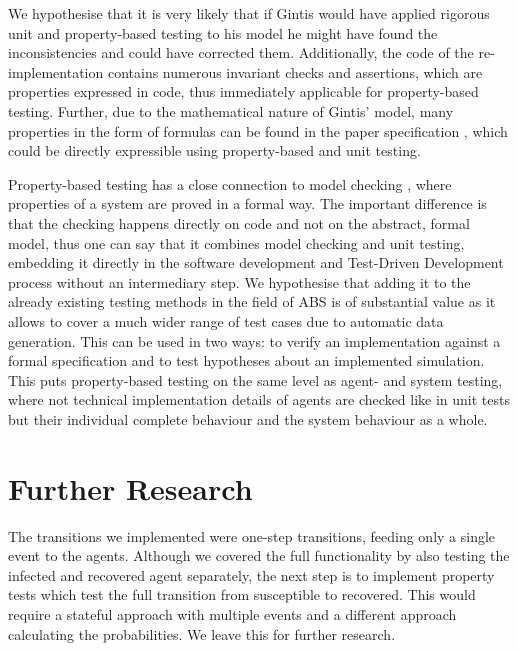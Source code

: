 We hypothesise that it is very likely that if Gintis \cite{gintis_emergence_2006} would have applied rigorous unit and property-based testing to his model he might have found the inconsistencies and could have corrected them. Additionally, the code of the re-implementation \cite{evensen_extensible_2010} contains numerous invariant checks and assertions, which are properties expressed in code, thus immediately applicable for property-based testing. Further, due to the mathematical nature of Gintis' model, many properties in the form of formulas can be found in the paper specification \cite{gintis_emergence_2006}, which could be directly expressible using property-based and unit testing. 

Property-based testing has a close connection to model checking \cite{mcmillan_symbolic_1993}, where properties of a system are proved in a formal way. The important difference is that the checking happens directly on code and not on the abstract, formal model, thus one can say that it combines model checking and unit testing, embedding it directly in the software development and Test-Driven Development process without an intermediary step. We hypothesise that adding it to the already existing testing methods in the field of ABS is of substantial value as it allows to cover a much wider range of test cases due to automatic data generation. This can be used in two ways: to verify an implementation against a formal specification and to test hypotheses about an implemented simulation. This puts property-based testing on the same level as agent- and system testing, where not technical implementation details of agents are checked like in unit tests but their individual complete behaviour and the system behaviour as a whole.

\section{Further Research}
\label{sec:further}
The transitions we implemented were one-step transitions, feeding only a single event to the agents. Although we covered the full functionality by also testing the infected and recovered agent separately, the next step is to implement property tests which test the full transition from susceptible to recovered. This would require a stateful approach with multiple events and a different approach calculating the probabilities. We leave this for further research. 

